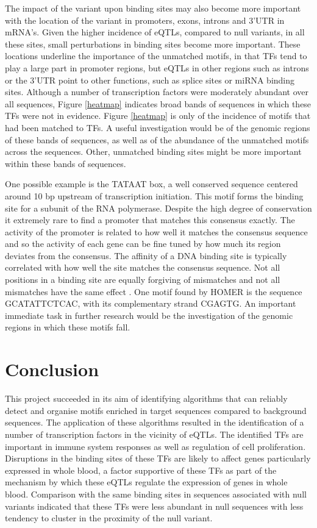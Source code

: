 \documentclass[12pt]{article}
\begin{document}
The impact of the variant upon binding sites may also become more important with the location of the variant in promoters, exons, introns and 3'UTR in mRNA's. Given the higher incidence of eQTLs, compared to null variants, in all these sites, small perturbations in binding sites become more important. These locations underline the importance of the unmatched motifs, in that TFs tend to play a large part in promoter regions, but eQTLs in other regions such as introns or the 3'UTR point to other functions, such as splice sites or miRNA binding sites. Although a number of transcription factors were moderately abundant over all sequences, Figure \ref{heatmap} indicates broad bands of sequences in which these TFs were not in evidence. Figure \ref{heatmap} is only of the incidence of motifs that had been matched to TFs. A useful investigation would be of the genomic regions of these bands of sequences, as well as of the abundance of the unmatched motifs across the sequences. Other, unmatched binding sites might be more important within these bands of sequences. 

One possible example is the TATAAT box, a well conserved sequence centered around 10 bp upstream of transcription initiation. This motif forms the binding site for a subunit of the RNA polymerase. Despite the high degree of conservation it extremely rare to find a promoter that matches this consensus exactly. The activity of the promoter is related to how well it matches the consensus sequence and so the activity of each gene can be fine tuned by how much its region deviates from the consensus. The affinity of a DNA binding site is typically correlated with how well the site matches the consensus sequence. Not all positions in a binding site are equally forgiving of mismatches and not all mismatches have the same effect \citep{d2006dna}. One motif found by HOMER is the sequence GCATATTCTCAC, with its complementary strand CGAGTG. An important immediate task in further research would be the investigation of the genomic regions in which these motifs fall.

\section{Conclusion}

This project succeeded in its aim of identifying algorithms that can reliably detect and organise motifs enriched in target sequences compared to background sequences. The application of these algorithms resulted in the identification of a number of transcription factors in the vicinity of eQTLs. The identified TFs are important in immune system responses as well as regulation of cell proliferation. Disruptions in the binding sites of these TFs are likely to affect genes particularly expressed in whole blood, a factor supportive of these TFs as part of the mechanism by which these eQTLs regulate the expression of genes in whole blood. Comparison with the same binding sites in sequences associated with null variants indicated that these TFs were less abundant in null sequences with less tendency to cluster in the proximity of the null variant. 
\end{document}
